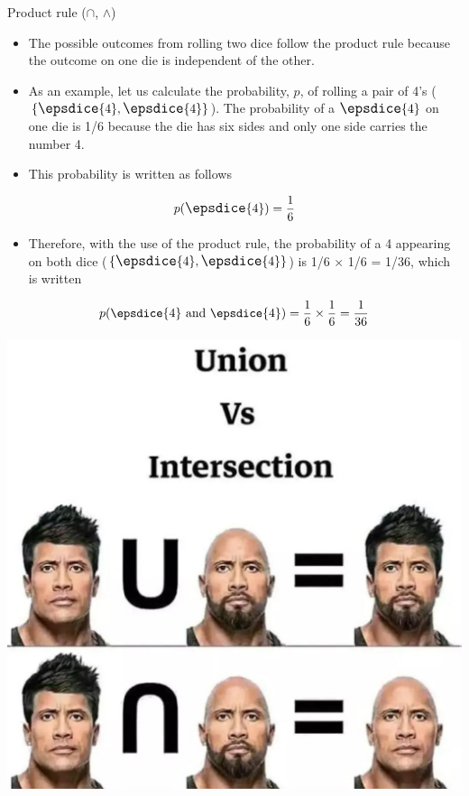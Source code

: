 \documentclass[11pt,ignorenonframetext,aspectratio=169]{beamer}
\providecommand{\tightlist}{%
  \setlength{\itemsep}{0pt}\setlength{\parskip}{0pt}}
\begin{document}
\begin{frame}{Product rule (\(\cap\), \(\land\))}
\protect\hypertarget{product-rule-cap-land}{}
\begin{itemize}
\tightlist
\item
  The possible outcomes from rolling two dice follow the product rule
  because the outcome on one die is independent of the other.
\item
  As an example, let us calculate the probability, \(p\), of rolling a
  pair of 4's (\(\large \{\epsdice{4}, \epsdice{4}\}\)). The probability
  of a \(\large \epsdice{4}\) on one die is 1/6 because the die has six
  sides and only one side carries the number 4.
\item
  This probability is written as follows
\end{itemize}

\[
p ({\large \epsdice{4}}) = \frac{1}{6}
\]

\begin{itemize}
\tightlist
\item
  Therefore, with the use of the product rule, the probability of a 4
  appearing on both dice (\(\large \{\epsdice{4}, \epsdice{4}\}\)) is
  1/6 × 1/6 = 1/36, which is written
\end{itemize}

\[
p (\epsdice{4} \text{ and } \epsdice{4}) = \frac{1}{6} \times \frac{1}{6} = \frac{1}{36}
\]
\end{frame}

\begin{frame}{}
\protect\hypertarget{section}{}
\begin{center}\includegraphics[width=0.45\linewidth]{../images/sum_versus_product} \end{center}
\end{frame}
\end{document}
